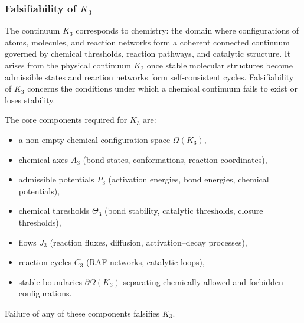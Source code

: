 
\subsubsection{Falsifiability of \texorpdfstring{$K_3$}{K_3}}
\label{sec:falsifiability-k3}

The continuum $K_3$ corresponds to chemistry: the domain where
configurations of atoms, molecules, and reaction networks form a
coherent connected continuum governed by chemical thresholds,
reaction pathways, and catalytic structure.  
It arises from the physical continuum $K_2$ once stable molecular
structures become admissible states and reaction networks form
self-consistent cycles.  
Falsifiability of $K_3$ concerns the conditions under which a chemical
continuum fails to exist or loses stability.

The core components required for $K_3$ are:
\begin{itemize}
    \item a non-empty chemical configuration space $\Omega(K_3)$,
    \item chemical axes $A_3$ (bond states, conformations, reaction
    coordinates),
    \item admissible potentials $P_3$ (activation energies,
    bond energies, chemical potentials),
    \item chemical thresholds $\Theta_3$ (bond stability,
    catalytic thresholds, closure thresholds),
    \item flows $J_3$ (reaction fluxes, diffusion, activation–decay
    processes),
    \item reaction cycles $C_3$ (RAF networks, catalytic loops),
    \item stable boundaries $\partial\Omega(K_3)$ separating chemically
    allowed and forbidden configurations.
\end{itemize}

Failure of any of these components falsifies $K_3$.



